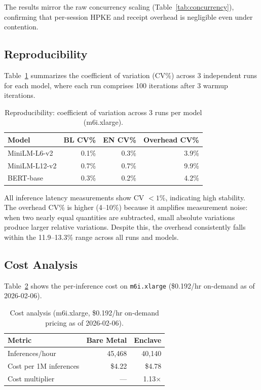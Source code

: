 \documentclass[11pt,a4paper]{article}
\newcommand{\BenchInstance}{m6i.xlarge}
\newcommand{\BenchModelName}{MiniLM-L6-v2}
\newcommand{\BenchNumRuns}{3}
\newcommand{\BenchOverheadRange}{11.9--13.3\%}
\begin{document}
The results mirror the raw concurrency scaling (Table~\ref{tab:concurrency}), confirming that per-session HPKE and receipt overhead is negligible even under contention.

\subsection{Reproducibility}

Table~\ref{tab:reproducibility} summarizes the coefficient of variation (CV\%) across \BenchNumRuns{} independent runs for each model, where each run comprises 100 iterations after 3 warmup iterations.

\begin{table}[ht]
\centering
\caption{Reproducibility: coefficient of variation across \BenchNumRuns{} runs per model (\BenchInstance{}).}
\label{tab:reproducibility}
\begin{tabular}{lrrr}
\hline
\textbf{Model} & \textbf{BL CV\%} & \textbf{EN CV\%} & \textbf{Overhead CV\%} \\
\hline
\BenchModelName{} & 0.1\% & 0.3\% & 3.9\% \\
MiniLM-L12-v2     & 0.7\% & 0.7\% & 9.9\% \\
BERT-base          & 0.3\% & 0.2\% & 4.2\% \\
\hline
\end{tabular}
\end{table}

All inference latency measurements show CV $< 1\%$, indicating high stability.
The overhead CV\% is higher (4--10\%) because it amplifies measurement noise: when two nearly equal quantities are subtracted, small absolute variations produce larger relative variations.
Despite this, the overhead consistently falls within the \BenchOverheadRange{} range across all runs and models.

\subsection{Cost Analysis}

Table~\ref{tab:cost} shows the per-inference cost on \texttt{m6i.xlarge} (\$0.192/hr on-demand as of 2026-02-06).

\begin{table}[ht]
\centering
\caption{Cost analysis (m6i.xlarge, \$0.192/hr on-demand pricing as of 2026-02-06).}
\label{tab:cost}
\begin{tabular}{lrr}
\hline
\textbf{Metric} & \textbf{Bare Metal} & \textbf{Enclave} \\
\hline
Inferences/hour        & 45{,}468 & 40{,}140 \\
Cost per 1M inferences & \$4.22 & \$4.78 \\
Cost multiplier        & ---    & 1.13$\times$ \\
\hline
\end{tabular}
\end{table}
\end{document}
